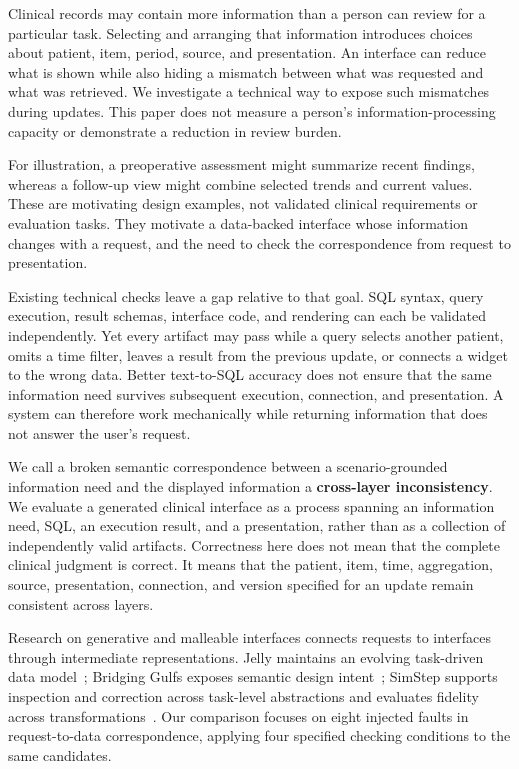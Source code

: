 \documentclass[manuscript,review,anonymous]{acmart}
\newcommand{\term}[1]{\textbf{#1}}
\begin{document}
Clinical records may contain more information than a person can review for a particular task. Selecting and arranging that information introduces choices about patient, item, period, source, and presentation. An interface can reduce what is shown while also hiding a mismatch between what was requested and what was retrieved. We investigate a technical way to expose such mismatches during updates. This paper does not measure a person's information-processing capacity or demonstrate a reduction in review burden.

For illustration, a preoperative assessment might summarize recent findings, whereas a follow-up view might combine selected trends and current values. These are motivating design examples, not validated clinical requirements or evaluation tasks. They motivate a data-backed interface whose information changes with a request, and the need to check the correspondence from request to presentation.

Existing technical checks leave a gap relative to that goal. SQL syntax, query execution, result schemas, interface code, and rendering can each be validated independently. Yet every artifact may pass while a query selects another patient, omits a time filter, leaves a result from the previous update, or connects a widget to the wrong data. Better text-to-SQL accuracy does not ensure that the same information need survives subsequent execution, connection, and presentation. A system can therefore work mechanically while returning information that does not answer the user's request.

We call a broken semantic correspondence between a scenario-grounded information need and the displayed information a \term{cross-layer inconsistency}. We evaluate a generated clinical interface as a process spanning an information need, SQL, an execution result, and a presentation, rather than as a collection of independently valid artifacts. Correctness here does not mean that the complete clinical judgment is correct. It means that the patient, item, time, aggregation, source, presentation, connection, and version specified for an update remain consistent across layers.

Research on generative and malleable interfaces connects requests to interfaces through intermediate representations. Jelly maintains an evolving task-driven data model~\cite{cao2025jelly}; Bridging Gulfs exposes semantic design intent~\cite{park2026bridging}; SimStep supports inspection and correction across task-level abstractions and evaluates fidelity across transformations~\cite{kaputa2026simstep}. Our comparison focuses on eight injected faults in request-to-data correspondence, applying four specified checking conditions to the same candidates.
\end{document}
